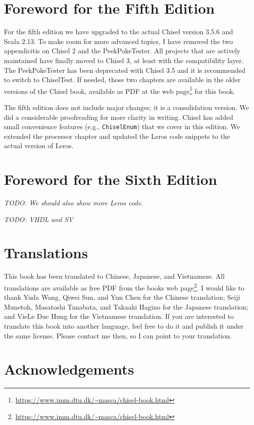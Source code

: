 \documentclass[%
    10pt,
    headinclude, footexclude,
    openright, %
    notitlepage,
    cleardoubleempty,
    headsepline,
    pointlessnumbers,
    bibtotoc, idxtotoc,
    ]{scrbook}
\newcommand{\code}[1]{{\small{\texttt{#1}}}}
\newcommand{\todo}[1]{{\emph{TODO: #1}}}
\newcommand{\myref}[2]{\href{#1}{#2}}
\renewcommand{\myref}[2]{{#2}{\footnote{\url{#1}}}}
\begin{document}
\section*{Foreword for the Fifth Edition}

For the fifth edition we have upgraded to the actual Chisel version 3.5.6 and Scala 2.13.
To make room for more advanced topics, I have removed the two appendicitis on
Chisel 2 and the PeekPokeTester. All projects that are actively maintained have finally
moved to Chisel 3, at least with the compatibility layer. The PeekPokeTester has been
deprecated with Chisel 3.5 and it is recommended to switch to ChiselTest.
If needed, those two chapters are available in the older versions of the Chisel book,
available as PDF at the \myref{https://www.imm.dtu.dk/~masca/chisel-book.html}{web page} for this book.

The fifth edition does not include major changes; it is a consolidation version.
We did a considerable proofreading for more clarity in writing. Chisel has added small convenience
features (e.g., \code{ChiselEnum}) that we cover in this edition.
We extended the processor chapter and updated the Leros code snippets
to the actual version of Leros.


\section*{Foreword for the Sixth Edition}

\todo{We should also show more Leros code.}

\todo{VHDL and SV}




\section*{Translations}

This book has been translated to Chinese, Japanese, and Vietnamese. All translations are available as free PDF
from the books \myref{https://www.imm.dtu.dk/~masca/chisel-book.html}{web page}.
I would like to thank Yuda Wang, Qiwei Sun, and Yun Chen for the Chinese translation;
Seiji Munetoh, Masatoshi Tanabata, and Takaaki Hagino for the Japanese translation;
and VieLe Duc Hung for the Vietnamese translation.
If you are interested to translate this book into another language, feel free to do it and
publish it under the same license. Please contact me then, so I can point to your translation.


\section*{Acknowledgements}
\end{document}
